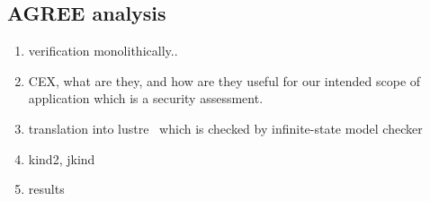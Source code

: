 
\subsection{AGREE analysis}

\begin{enumerate}
    
    \item verification monolithically.. 
    \item CEX, what are they, and how are they useful for our intended scope of application which is a security assessment. 

    \item translation into lustre~\cite{} which is checked by infinite-state model checker 

    \item kind2, jkind 

    \item results

\end{enumerate}